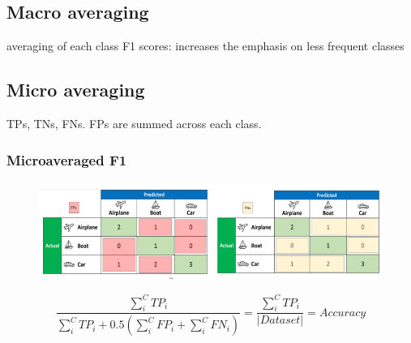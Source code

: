 \documentclass[11pt]{article}
\begin{document}
\subsection{Macro averaging}

averaging of each class F1 scores: increases the emphasis on less frequent classes

\subsection{Micro averaging}

TPs, TNs,  FNs. FPs are summed across each class.

\subsubsection{Microaveraged F1}

\begin{figure}[H]
    \centering
    \includegraphics[width=.9\linewidth]{figures/f1.png}    
\end{figure}

\begin{equation*}
    \frac{\sum^C_i TP_i}{\sum^C_i TP_i + 0.5 (\sum^C_i FP_i + \sum^C_i FN_i)} = \frac{\sum^C_i TP_i}{|Dataset|} = Accuracy
\end{equation*}

\printbibliography
{}
\end{document}
